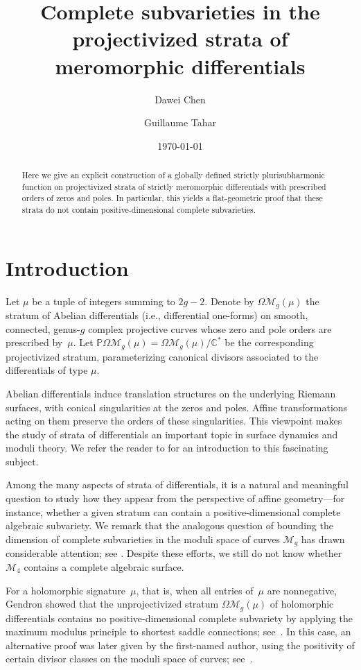 \documentclass[11]{amsart}
\title[Complete subvarieties in the strata of differentials]{Complete subvarieties in the projectivized strata of meromorphic differentials}
\author{Dawei Chen}
\author{Guillaume Tahar}
\date{\today}
\theoremstyle{plain}
\theoremstyle{definition}
\begin{document}
\begin{abstract}
Here we give an explicit construction of a globally defined strictly plurisubharmonic function on projectivized strata of strictly meromorphic differentials with prescribed orders of zeros and poles. In particular, this yields a flat-geometric proof that these strata do not contain positive-dimensional complete subvarieties.
\end{abstract}

\maketitle

\section{Introduction}

Let $\mu$ be a tuple of integers summing to $2g-2$. Denote by $\Omega\mathcal M_{g}(\mu)$ the stratum of Abelian differentials (i.e., differential one-forms) on smooth, connected, genus-$g$ complex projective curves whose zero and pole orders are prescribed by~$\mu$. Let $\mathbb P\Omega\mathcal{M}_g(\mu) = \Omega\mathcal{M}_g(\mu)/\mathbb C^{*}$ be the corresponding projectivized stratum, parameterizing canonical divisors associated to the differentials of type $\mu$. 

Abelian differentials induce translation structures on the underlying Riemann surfaces, with conical singularities at the zeros and poles. Affine transformations acting on them preserve the orders of these singularities. This viewpoint makes the study of strata of differentials an important topic in surface dynamics and moduli theory. We refer the reader to \cite{Zo06, Wr15, Ch17, CY26} for an introduction to this fascinating subject. 

Among the many aspects of strata of differentials, it is a natural and meaningful question to study how they appear from the perspective of affine geometry---for instance, whether a given stratum can contain a positive-dimensional complete algebraic subvariety. We remark that the analogous question of bounding the dimension of complete subvarieties in the moduli space of curves $\mathcal M_g$ has drawn considerable attention; see \cite{Di84, Lo95, Za99}. Despite these efforts, we still do not know whether $\mathcal M_4$ contains a complete algebraic surface. 

For a holomorphic signature~$\mu$, that is, when all entries of~$\mu$ are nonnegative, Gendron showed that the unprojectivized stratum $\Omega\mathcal M_{g}(\mu)$ of holomorphic differentials contains no positive-dimensional complete subvariety by applying the maximum modulus principle to shortest saddle connections; see~\cite{G20}. In this case, an alternative proof was later given by the first-named author, using the positivity of certain divisor classes on the moduli space of curves; see~\cite{C23}. 
\end{document}
